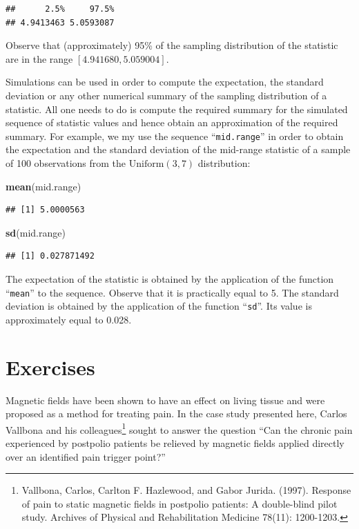 \documentclass[]{krantz}
\makeatletter
\newenvironment{Shaded}{\begin{snugshade}}{\end{snugshade}}
\newcommand{\KeywordTok}[1]{\textcolor[rgb]{0.13,0.29,0.53}{\textbf{#1}}}
\newcommand{\NormalTok}[1]{#1}
\newenvironment{kframe}{%
\medskip{}
\setlength{\fboxsep}{.8em}
 \def\at@end@of@kframe{}%
 \ifinner\ifhmode%
  \def\at@end@of@kframe{\end{minipage}}%
  \begin{minipage}{\columnwidth}%
 \fi\fi%
 \def\FrameCommand##1{\hskip\@totalleftmargin \hskip-\fboxsep
 \colorbox{shadecolor}{##1}\hskip-\fboxsep
     \hskip-\linewidth \hskip-\@totalleftmargin \hskip\columnwidth}%
 \MakeFramed {\advance\hsize-\width
   \@totalleftmargin\z@ \linewidth\hsize
   \@setminipage}}%
 {\par\unskip\endMakeFramed%
 \at@end@of@kframe}
\renewenvironment{Shaded}{\begin{kframe}}{\end{kframe}}
\theoremstyle{definition}
\theoremstyle{definition}
\theoremstyle{definition}
\theoremstyle{remark}
\makeatother
\begin{document}
\begin{verbatim}
##      2.5%     97.5% 
## 4.9413463 5.0593087
\end{verbatim}

Observe that (approximately) 95\% of the sampling distribution of the
statistic are in the range \([4.941680, 5.059004]\).

Simulations can be used in order to compute the expectation, the
standard deviation or any other numerical summary of the sampling
distribution of a statistic. All one needs to do is compute the required
summary for the simulated sequence of statistic values and hence obtain
an approximation of the required summary. For example, we my use the
sequence ``\texttt{mid.range}'' in order to obtain the expectation and
the standard deviation of the mid-range statistic of a sample of 100
observations from the \(\mathrm{Uniform}(3,7)\) distribution:

\begin{Shaded}
\begin{Highlighting}[]
\KeywordTok{mean}\NormalTok{(mid.range)}
\end{Highlighting}
\end{Shaded}

\begin{verbatim}
## [1] 5.0000563
\end{verbatim}

\begin{Shaded}
\begin{Highlighting}[]
\KeywordTok{sd}\NormalTok{(mid.range)}
\end{Highlighting}
\end{Shaded}

\begin{verbatim}
## [1] 0.027871492
\end{verbatim}

The expectation of the statistic is obtained by the application of the
function ``\texttt{mean}'' to the sequence. Observe that it is
practically equal to 5. The standard deviation is obtained by the
application of the function ``\texttt{sd}''. Its value is approximately
equal to 0.028.

\section{Exercises}\label{exercises-4}

Magnetic fields have been shown to have an effect on living tissue and
were proposed as a method for treating pain. In the case study presented
here, Carlos Vallbona and his colleagues\footnote{Vallbona, Carlos,
  Carlton F. Hazlewood, and Gabor Jurida. (1997). Response of pain to
  static magnetic fields in postpolio patients: A double-blind pilot
  study. Archives of Physical and Rehabilitation Medicine 78(11):
  1200-1203.} sought to answer the question ``Can the chronic pain
experienced by postpolio patients be relieved by magnetic fields applied
directly over an identified pain trigger point?''
\end{document}
